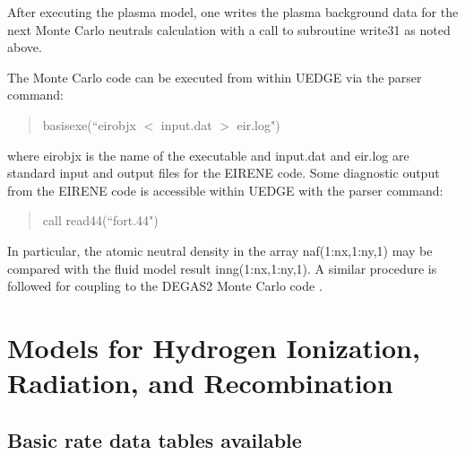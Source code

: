 \documentclass [12pt]{article}
\begin{document}
After executing the plasma model, one writes the plasma background
data for the next Monte Carlo neutrals calculation with a call to
subroutine write31 as noted above.  

The Monte Carlo code can be executed from within {\sf UEDGE} via the parser
command:
\begin{verse} \sf
        basisexe(``eirobjx $<$ input.dat $>$ eir.log")
\end{verse}
where {\sf eirobjx} is the name of the executable and {\sf input.dat} and {\sf
  eir.log} are standard input and output files for the {\sf EIRENE} code.
Some diagnostic output from the {\sf EIRENE} code is accessible within {\sf
  UEDGE} with the parser command:
\begin{verse} \sf
        call read44(``fort.44")
\end{verse}
In particular, the atomic neutral density in the array {\sf naf(1:nx,1:ny,1)}
may be compared with the fluid model result in{\sf ng(1:nx,1:ny,1)}.  A
similar procedure is followed for coupling to the {\sf DEGAS2} Monte Carlo
code \cite{stotler00}.

\section{Models for Hydrogen Ionization, Radiation, and Recombination}
\subsection{Basic rate data tables available}
\end{document}
